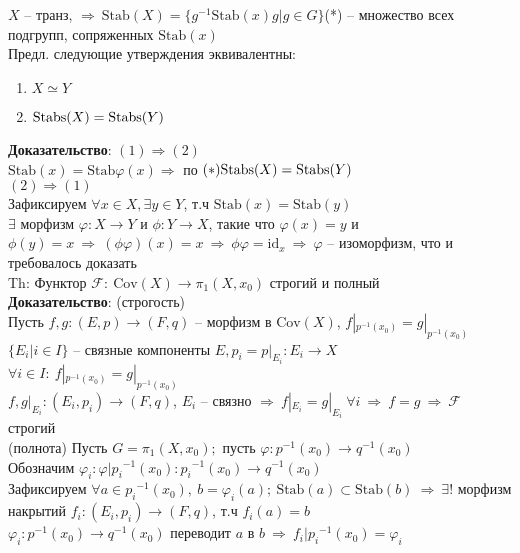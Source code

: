 	$X$ -- транз, $\Rightarrow\ \text{Stab}(X) = \{g^{-1}\text{Stab}(x)g|g \in G\}$(*) -- множество всех подгрупп, сопряженных $\text{Stab}(x)$\\
	Предл. следующие утверждения эквивалентны:\\
	\begin{enumerate}
	\item $X \simeq Y$
	\item $\text{\text{Stabs}}(X) = \text{\text{Stabs}}(Y)$
	\end{enumerate}
	\textbf{Доказательство}: $(1) \Rightarrow (2)$\\
	$\text{Stab}(x) = \text{Stab}\varphi(x) \Rightarrow$ по $(*) \text{\text{Stabs}}(X) = \text{\text{Stabs}}(Y)$\\
	$(2) \Rightarrow (1)$\\
	Зафиксируем $\forall x \in X, \exists y \in Y$, т.ч $\text{Stab}(x) = \text{Stab}(y)$\\
	$\exists$ морфизм $\varphi: X \rightarrow Y$ и $\phi: Y \rightarrow X$, такие что $\varphi(x) = y$ и $\phi(y) = x\ \Rightarrow\ (\phi \varphi)(x) = x\ \Rightarrow\ \phi \varphi =  \text{id}_x\ \Rightarrow\ \varphi$ -- изоморфизм, что и требовалось доказать\\
	Th: Функтор $\mathcal{F}: \ \text{Cov}(X)\rightarrow {\pi}_1 (X, x_0)$ строгий и полный\\
	\textbf{Доказательство}: (строгость)\\
	Пусть $f, g: (E,p) \rightarrow (F,q)$ -- морфизм в $\text{Cov}(X)$, $f|_{p^{-1}(x_0)} = g|_{p^{-1}(x_0)}$\\
	$\{E_{i}|i \in I\}$ -- связные компоненты $E, p_i = p|_{E_i}: E_i \rightarrow X$\\
	$\forall i \in I: \ f|_{p^{-1}(x_0)} = g|_{p^{-1}(x_0)}$\\
	$f,g|_{E_i}: (E_i,p_i) \rightarrow (F,q)$, $E_i$ -- связно $\Rightarrow\ f|_{E_i} = g|_{E_i}\ \forall i\ \Rightarrow\ f = g\ \Rightarrow\ \mathcal{F}$ строгий\\
	(полнота) Пусть $G = {\pi}_1 (X, x_0);$ пусть $\varphi: p^{-1}(x_0) \rightarrow q^{-1}(x_0)$\\
	Обозначим $\varphi_i: \varphi|{p_i}^{-1}(x_0): {p_i}^{-1}(x_0) \rightarrow q^{-1}(x_0)$\\
	Зафиксируем $\forall a \in {p_i}^{-1}(x_0),\ b = \varphi_i(a);\ \text{Stab}(a) \subset \text{Stab}(b)\ \Rightarrow\ \exists!$ морфизм накрытий $f_i: (E_i,p_i) \rightarrow (F,q)$, т.ч $f_i(a) = b$\\
	$\varphi_i: p^{-1}(x_0) \rightarrow q^{-1}(x_0)$ переводит $a$ в $b\ \Rightarrow\ f_i|{p_i}^{-1}(x_0) = \varphi_i$\\

